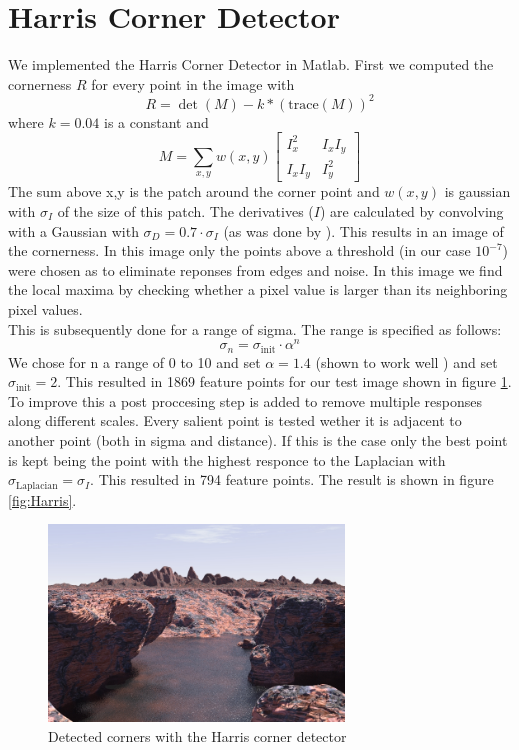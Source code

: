 \documentclass{article}
\begin{document}
\section{Harris Corner Detector}
We implemented the Harris Corner Detector in Matlab. 
First we computed the cornerness $R$ for every point in the image with
\begin{equation}
R = \det(M) - k*(\mathrm{trace}(M))^2
\end{equation}
where $k=0.04$ is a constant and
\begin{equation}
M = \sum_{x,y} w(x,y) \begin{bmatrix}
I_x^2 & I_x I_y\\
I_x I_y & I_y^2
\end{bmatrix}
\end{equation}
The sum above x,y is the patch around the corner point and $w(x,y)$ is gaussian with $\sigma_I$ of the size of this patch. The derivatives ($I$) are calculated by convolving with a Gaussian with $\sigma_D = 0.7 \cdot \sigma_I$ (as was done by \cite{Miko}). This results in an image of the cornerness. In this image only the points above a threshold (in our case $10^{-7}$) were chosen as to eliminate reponses from edges and noise. In this image we find the local maxima by checking whether a pixel value is larger than its neighboring pixel values.\\
This is subsequently done for a range of sigma. The range is specified as follows:
\[
\sigma_n = \sigma_\mathrm{init} \cdot \alpha^n
\]
We chose for n a range of 0 to 10 and set $\alpha = 1.4$ (shown to work well \cite{lindeberg}) and set $\sigma_\mathrm{init} = 2$. This resulted in 1869 feature points for our test image shown in figure \ref{fig:mountain}.\\
To improve this a post proccesing step is added to remove multiple responses along different scales. Every salient point is tested wether it is adjacent to another point (both in sigma and distance). If this is the case only the best point is kept being the point with the highest responce to the Laplacian with $\sigma_\mathrm{Laplacian} = \sigma_I$. This resulted in 794 feature points. The result is shown in figure \ref{fig:Harris}.

\begin{figure}[ht]
\centering
\includegraphics[width=0.7\textwidth]{img/mountain.jpg}
\caption{Detected corners with the Harris corner detector}
\label{fig:mountain}
\end{figure}
\end{document}

